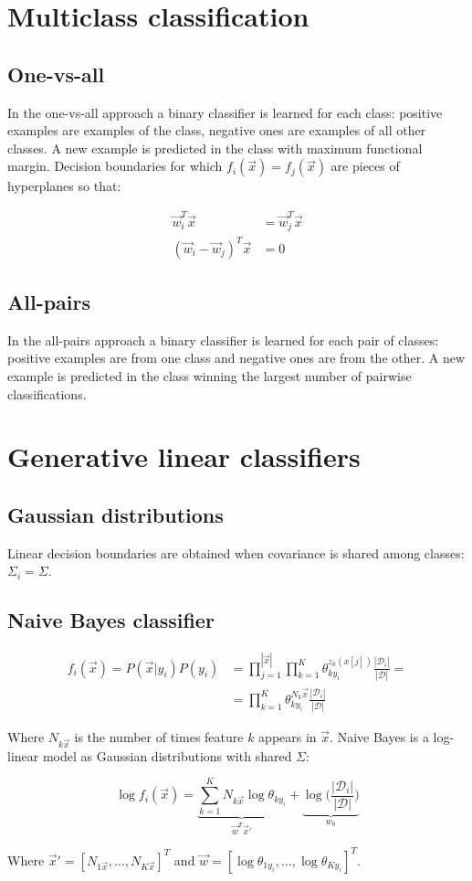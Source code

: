 \section{Multiclass classification}

	\subsection{One-vs-all}
	In the one-vs-all approach a binary classifier is learned for each class: positive examples are examples of the class, negative ones are examples of all other classes.
	A new example is predicted in the class with maximum functional margin.
	Decision boundaries for which $f_i(\vec{x}) = f_j(\vec{x})$ are pieces of hyperplanes so that:

	\begin{align*}
		\vec{w}^T_i\vec{x} &= \vec{w}^T_j\vec{x}\\
		(\vec{w}_i-\vec{w}_j)^T\vec{x} &= 0
	\end{align*}

	\subsection{All-pairs}
	In the all-pairs approach a binary classifier is learned for each pair of classes: positive examples are from one class and negative ones are from the other.
	A new example is predicted in the class winning the largest number of pairwise classifications.

\section{Generative linear classifiers}

	\subsection{Gaussian distributions}
	Linear decision boundaries are obtained when covariance is shared among classes: $\Sigma_i = \Sigma$.

	\subsection{Naive Bayes classifier}

	\begin{align*}
		f_i(\vec{x}) = P(\vec{x}|y_i)P(y_i) &=\prod\limits_{j=1}^{|\vec{x}|}\prod\limits_{k=1}^K\theta_{ky_i}^{z_k(x[j])}\frac{|\mathcal{D}_i|}{|\mathcal{D}|}=\\
																				&=\prod\limits_{k=1}^K\theta_{ky_i}^{N_k\vec{x}}\frac{|\mathcal{D}_i|}{|\mathcal{D}|}
	\end{align*}

	Where $N_{k\vec{x}}$ is the number of times feature $k$ appears in $\vec{x}$.
	Naive Bayes is a log-linear model as Gaussian distributions with shared $\Sigma$:

	$$\log f_i(\vec{x}) = \underbrace{\sum\limits_{k=1}^K N_{k\vec{x}}\log\theta_{ky_i}}_{\vec{w}^T\vec{x}'}+\underbrace{\log\biggl(\frac{|\mathcal{D}_i|}{|\mathcal{D}|}\biggr)}_{w_0}$$

	Where $\vec{x}' = [N_{1\vec{x}},\dots, N_{K\vec{x}}]^T$ and $\vec{w} = [\log\theta_{1y_i},\dots, \log\theta_{Ky_i}]^T$.
